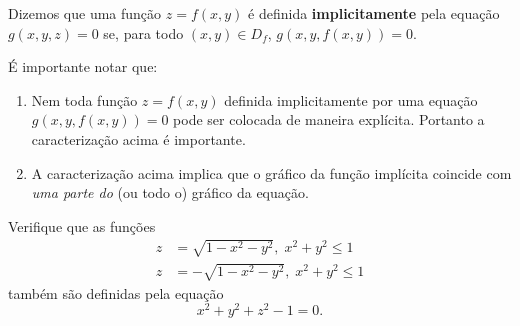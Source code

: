 \begin{definition}
    Dizemos que uma função \(z = f(x,y)\) é definida \textbf{implicitamente} pela equação \(g(x,y,z) = 0\) se, para todo \((x,y)\in D_f\), \(g(x,y,f(x,y)) = 0.\)
\end{definition}

\begin{remark}
    É importante notar que:
        \begin{enumerate}
            \item Nem toda função \(z = f(x,y)\) definida implicitamente por uma equação \(g(x,y,f(x,y)) = 0\) pode ser colocada de maneira explícita. Portanto a caracterização acima é importante.
            \item A caracterização acima implica que o gráfico da função implícita coincide com \textit{uma parte do} (ou todo o) gráfico da equação.
        \end{enumerate}
\end{remark}

\begin{exercise}
    Verifique que as funções
        \begin{align*}
            z & = \sqrt{1-x^2-y^2},\; x^2 + y^2 \leq 1 \\
            z & = - \sqrt{1-x^2-y^2},\; x^2 + y^2 \leq 1
        \end{align*}
também são definidas pela equação \[x^2 + y^2 + z^2 - 1 = 0.\]
\end{exercise}

